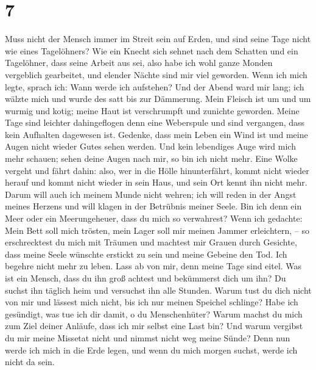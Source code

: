 \hypertarget{section-6}{%
\section{7}\label{section-6}}

 Muss nicht der Mensch immer im Streit sein auf Erden, und
sind seine Tage nicht wie eines Tagelöhners?  Wie ein
Knecht sich sehnet nach dem Schatten und ein Tagelöhner, dass seine
Arbeit aus sei,  also habe ich wohl ganze Monden
vergeblich gearbeitet, und elender Nächte sind mir viel geworden.
 Wenn ich mich legte, sprach ich: Wann werde ich
aufstehen? Und der Abend ward mir lang; ich wälzte mich und wurde des
satt bis zur Dämmerung.  Mein Fleisch ist um und um wurmig
und kotig; meine Haut ist verschrumpft und zunichte geworden.
 Meine Tage sind leichter dahingeflogen denn eine
Weberspule und sind vergangen, dass kein Aufhalten dagewesen ist.
 Gedenke, dass mein Leben ein Wind ist und meine Augen
nicht wieder Gutes sehen werden.  Und kein lebendiges Auge
wird mich mehr schauen; sehen deine Augen nach mir, so bin ich nicht
mehr.  Eine Wolke vergeht und fährt dahin: also, wer in
die Hölle hinunterfährt, kommt nicht wieder herauf  und
kommt nicht wieder in sein Haus, und sein Ort kennt ihn nicht mehr.
 Darum will auch ich meinem Munde nicht wehren; ich will
reden in der Angst meines Herzens und will klagen in der Betrübnis
meiner Seele.  Bin ich denn ein Meer oder ein
Meerungeheuer, dass du mich so verwahrest?  Wenn ich
gedachte: Mein Bett soll mich trösten, mein Lager soll mir meinen Jammer
erleichtern, --  so erschrecktest du mich mit Träumen und
machtest mir Grauen durch Gesichte,  dass meine Seele
wünschte erstickt zu sein und meine Gebeine den Tod.  Ich
begehre nicht mehr zu leben. Lass ab von mir, denn meine Tage sind
eitel.  Was ist ein Mensch, dass du ihn groß achtest und
bekümmerst dich um ihn?  Du suchst ihn täglich heim und
versuchst ihn alle Stunden.  Warum tust du dich nicht von
mir und lässest mich nicht, bis ich nur meinen Speichel schlinge?
 Habe ich gesündigt, was tue ich dir damit, o du
Menschenhüter? Warum machst du mich zum Ziel deiner Anläufe, dass ich
mir selbst eine Last bin?  Und warum vergibst du mir
meine Missetat nicht und nimmst nicht weg meine Sünde? Denn nun werde
ich mich in die Erde legen, und wenn du mich morgen suchst, werde ich
nicht da sein.

